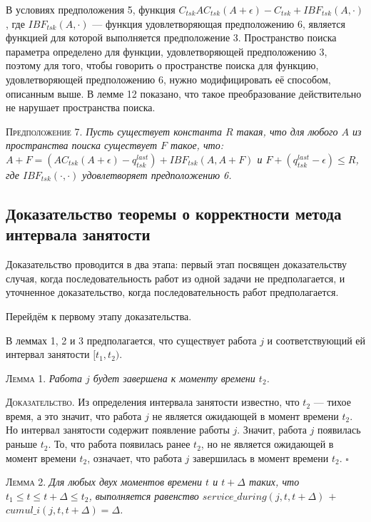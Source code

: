 В условиях предположения 5, функция $C_{tsk}AC_{tsk}(A + \epsilon) - C_{tsk} + IBF_{tsk}(A, \cdot)$,
  где $IBF_{tsk}(A, \cdot)$ --- функция удовлетворяющая предположению 6,
  является функцией для которой выполняется предположение 3.
  Пространство поиска параметра определено для функции, удовлетворяющей предположению 3,
  поэтому для того, чтобы говорить о пространстве поиска для функцию, удовлетворяющей
  предположению 6, нужно модифицировать её способом, описанным выше.
  В лемме 12 показано, что такое преобразование действительно не нарушает пространства поиска.

\textsc{Предположение 7.}
\textit{Пусть существует константа $R$ такая, что для любого $A$ из пространства
  поиска существует $F$ такое, что:
  $A + F = (AC_{tsk}(A + \epsilon) - q_{tsk}^{last}) + IBF_{tsk}(A, A + F)$ и $F + (q_{tsk}^{last} - \epsilon) \leq R$,
  где $IBF_{tsk}(\cdot, \cdot)$ удовлетворяет предположению 6. }


\subsection{Доказательство теоремы о корректности метода интервала занятости}

Доказательство проводится в два этапа: первый этап посвящен доказательству случая, когда последовательность
  работ из одной задачи не предполагается, и уточненное доказательство, когда последовательность
  работ предполагается.

Перейдём к первому этапу доказательства.

В леммах 1, 2 и 3  предполагается, что существует работа $j$ и соответствующий ей интервал занятости $[t_1, t_2)$.

\textsc{Лемма 1. }
\textit{Работа $j$ будет завершена к моменту времени $t_2$. }

\textsc{Доказательство.}
  Из определения интервала занятости известно, что $t_2$ --- тихое время, а это
    значит, что работа $j$ не является ожидающей в момент времени $t_2$.
    Но интервал занятости содержит появление работы $j$. Значит, работа $j$
    появилась раньше $t_2$. То, что работа появилась ранее $t_2$,
    но не является ожидающей в момент времени $t_2$, означает, что работа $j$
    завершилась в момент времени $t_2$.
$\square$

\textsc{Лемма 2. }
\textit{Для любых двух моментов времени $t$ и $t + \Delta$ таких, что $t_1 \leq t \leq t + \Delta \leq t_2$, выполняется равенство $service\_during (j, t, t + \Delta)$ $+$ $cumul\_i(j, t, t + \Delta) = \Delta$. }

